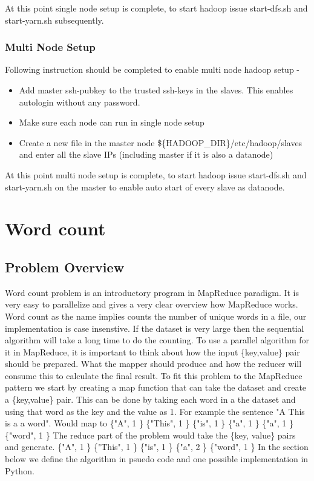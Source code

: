 \documentclass{article}
\begin{document}
At this point single node setup is complete, to start hadoop issue start-dfs.sh and start-yarn.sh subsequently.

\subsubsection{Multi Node Setup}
Following instruction should be completed to enable multi node hadoop setup -
\begin{itemize}
\item Add master ssh-pubkey to the trusted ssh-keys in the slaves. This enables autologin without any password.
\item Make sure each node can run in single node setup
\item Create a new file in the master node  \$\{HADOOP\_DIR\}/etc/hadoop/slaves and enter all the slave IPs (including master if it is also a datanode)
\end{itemize}

At this point multi node setup is complete, to start hadoop issue start-dfs.sh and start-yarn.sh on the master to enable auto start of every slave as datanode.

\section{Word count}
\subsection{Problem Overview}
Word count problem is an introductory program in MapReduce paradigm. It is very easy to parallelize and gives a very clear overview how MapReduce works.
\BlankLine Word count as the name implies counts the number of unique words in a file, our implementation is case insenstive. If the dataset is very large then the sequential algorithm will take a long time to do the counting.
To use a parallel algorithm for it in MapReduce, it is important to think about how the input \{key,value\} pair should be prepared. What the mapper should produce and how the reducer will consume this to calculate the final result.
To fit this problem to the MapReduce pattern we start by creating a map function that can take the dataset and create a \{key,value\} pair.
This can be done by taking each word in a the dataset and using that word as the key and the value as 1.
 For example the sentence "A This is a a word". Would map to
 \BlankLine \{"A", 1 \}
\BlankLine \{"This", 1 \}
\BlankLine \{"is", 1 \}
\BlankLine \{"a", 1 \}
\BlankLine \{"a", 1 \}
\BlankLine \{"word", 1 \}
\BlankLine The reduce part of the problem would take the \{key, value\} pairs and generate.
\BlankLine \{"A", 1 \}
\BlankLine \{"This", 1 \}
\BlankLine \{"is", 1 \}
\BlankLine \{"a", 2 \}
\BlankLine \{"word", 1 \}
\BlankLine In the section below we define the algorithm in psuedo code and one possible implementation in Python.
\end{document}
